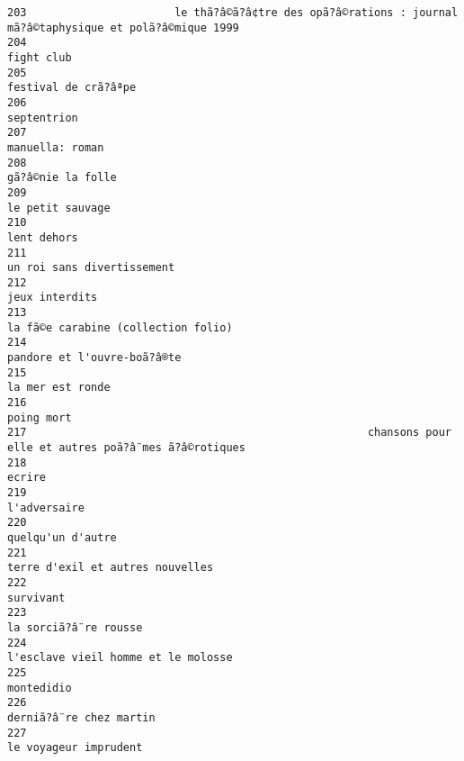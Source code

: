 \documentclass[
]{report}
\begin{document}
\begin{verbatim}
203                       le thã?â©ã?â¢tre des opã?â©rations : journal mã?â©taphysique et polã?â©mique 1999
204                                                                                              fight club
205                                                                                    festival de crã?âªpe
206                                                                                             septentrion
207                                                                                         manuella: roman
208                                                                                       gã?â©nie la folle
209                                                                                        le petit sauvage
210                                                                                             lent dehors
211                                                                              un roi sans divertissement
212                                                                                          jeux interdits
213                                                                     la fã©e carabine (collection folio)
214                                                                             pandore et l'ouvre-boã?â®te
215                                                                                        la mer est ronde
216                                                                                              poing mort
217                                                     chansons pour elle et autres poã?â¨mes ã?â©rotiques
218                                                                                                  ecrire
219                                                                                            l'adversaire
220                                                                                       quelqu'un d'autre
221                                                                        terre d'exil et autres nouvelles
222                                                                                               survivant
223                                                                                   la sorciã?â¨re rousse
224                                                                     l'esclave vieil homme et le molosse
225                                                                                              montedidio
226                                                                                 derniã?â¨re chez martin
227                                                                                   le voyageur imprudent

\end{verbatim}
\end{document}
